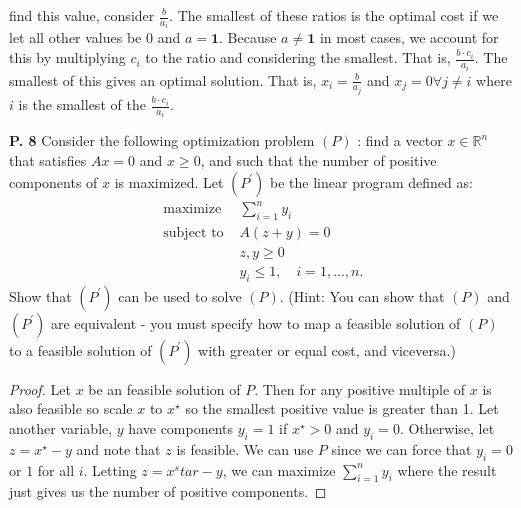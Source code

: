 \documentclass{article}
\begin{document}
\begin{jacklist}
\begin{itemize}
            find this value, consider $ \frac{b}{a_i}$. The smallest of these ratios is the optimal cost if we let all other values
            be 0 and $a = \textbf{1}$. Because $a \neq \textbf{1}$ in most cases, we account for this by multiplying $c_i$ to the ratio 
            and considering the smallest. That is, $ \frac{b \cdot c_i}{a_i}$. The smallest of this gives an optimal solution. That is, 
            $x_i = \frac{b}{a_j}$ and $x_j = 0 \forall j \neq i$ where $i$ is the smallest of the $ \frac{b \cdot c_i}{a_i}$. 
    \end{itemize}
\newpage
    \begin{framed} 
    \item [\textbf{P. 8}] Consider the following optimization problem $(P)$ : find a vector $x \in \mathbb{R}^{n}$ that satisfies 
        $A x=0$ and $x \geq 0$, and such that the number of positive components of $x$ is maximized. Let $\left(P^{\prime}\right)$ 
        be the linear program defined as: 
        \[ 
            \begin{aligned}
                \text { maximize } & \sum_{i=1}^{n} y_{i} \\
                \text { subject to } & A(z+y)=0 \\
                & z, y \geq 0 \\
                & y_{i} \leq 1, \quad i=1, \ldots, n .
            \end{aligned}
        \] Show that $\left(P^{\prime}\right)$ can be used to solve $(P)$. (Hint: You can show that $(P)$ and $\left(P^{\prime}\right)$ 
        are equivalent - you must specify how to map a feasible solution of $(P)$ to a feasible solution of 
        $\left(P^{\prime}\right)$ with greater or equal cost, and viceversa.)
    \end{framed}
    \begin{proof}
        Let $x$ be an feasible solution of $P$. Then for any positive multiple of $x$ is also feasible so scale $x$ to $x^\star$ so
        the smallest positive value is greater than 1. Let another variable, $y$ have components $y_i = 1$ if $x^\star > 0$ and $y_i = 
        0$. Otherwise, let $z = x^\star -y$ and note that $z$ is feasible. We can use $P$ since we can force that $y_i = 0$ or $1$ 
        for all $i$. Letting $z = x^star - y$, we can maximize $\sum_{i=1}^ny_i$ where the result just gives us the number of positive 
        components. 
    \end{proof}
\end{jacklist}
\end{document}
